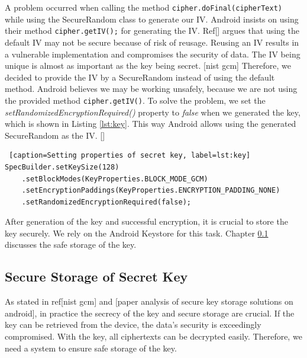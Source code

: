 A problem occurred when calling the method \texttt{cipher.doFinal(cipherText)} while using the SecureRandom class to generate our IV. 
Android insists on using their method \texttt{cipher.getIV();} for generating the IV. Ref[]%
argues that using the default IV may not be secure because of risk of reusage. Reusing an IV results in a vulnerable implementation and compromises the security of data. The IV being unique is almost as important as the key being secret. [nist gcm] Therefore, we decided to provide the IV by a SecureRandom instead of using the default method. Android believes we may be working unsafely, because we are not using the provided method \texttt{cipher.getIV()}. To solve the problem, we set the \textit{setRandomizedEncryptionRequired()} property to \textit{false} when we generated the key, which is shown in Listing \ref{lst:key}. This way Android allows using the generated SecureRandom as the IV. []

\begin{lstlisting} [caption=Setting properties of secret key, label=lst:key]
SpecBuilder.setKeySize(128)
    .setBlockModes(KeyProperties.BLOCK_MODE_GCM)
    .setEncryptionPaddings(KeyProperties.ENCRYPTION_PADDING_NONE)
    .setRandomizedEncryptionRequired(false);
\end{lstlisting}


After generation of the key and successful encryption, it is crucial to store the key securely. We rely on the Android Keystore for this task. Chapter \ref{arch_keystore} discusses the safe storage of the key.




\subsection{Secure Storage of Secret Key} \label{arch_keystore}
As stated in ref[nist gcm] and [paper analysis of secure key storage solutions on android],  in practice the secrecy of the key and secure storage are crucial. If the key can be retrieved from the device, the data's security is exceedingly compromised. With the key, all ciphertexts can be decrypted easily. Therefore, we need a system to ensure safe storage of the key. \\

